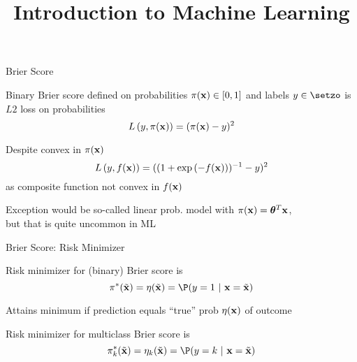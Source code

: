 \documentclass[11pt,compress,t,notes=noshow, xcolor=table]{beamer}
\title{Introduction to Machine Learning}
\begin{document}
    


\begin{framei}[fs=small,sep=M]{Brier Score}

\item Binary Brier score defined on probabilities $\pi(\mathbf{x}) \in [0, 1]$ and labels $y \in \setzo$ is $L2$ loss on probabilities $$L\left(y, \pi(\mathbf{x})\right) = (\pi(\mathbf{x}) - y)^2$$
\item Despite convex in $\pi(\mathbf{x})$ $$L\left(y, f(\mathbf{x})\right)=((1+\exp{(-f(\mathbf{x}))})^{-1}-y)^2$$ as composite function not convex in $f(\mathbf{x})$
\item Exception would be so-called linear prob. model with $\pi(\mathbf{x}) = \bm{\theta}^T \mathbf{x}$,\\
but that is quite uncommon in ML 

\vfill 


\end{framei}

\begin{framei}[sep=L]{Brier Score: Risk Minimizer}

\item Risk minimizer for (binary) Brier score is $$\piastxtil = \eta(\xtil) = \P(y=1~|~\xv = \xtil)$$
\item Attains minimum if prediction equals \enquote{true} prob $\eta(\mathbf{x})$ of outcome
\item Risk minimizer for multiclass Brier score is 
$$\piastkxtil = \eta_k(\xtil) =  \P(y = k ~|~ \xv = \xtil) $$

\end{framei}
\end{document}

